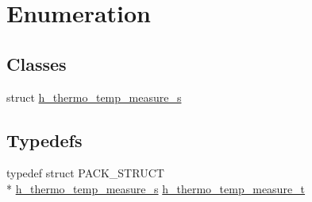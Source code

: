 \hypertarget{group___enumeration}{\section{Enumeration}
\label{group___enumeration}
}
\subsection*{Classes}
\begin{DoxyCompactItemize}
\item 
struct \hyperlink{structh__thermo__temp__measure__s}{h\-\_\-thermo\-\_\-temp\-\_\-measure\-\_\-s}
\end{DoxyCompactItemize}
\subsection*{Typedefs}
\begin{DoxyCompactItemize}
\item 
typedef struct P\-A\-C\-K\-\_\-\-S\-T\-R\-U\-C\-T \\*
\hyperlink{structh__thermo__temp__measure__s}{h\-\_\-thermo\-\_\-temp\-\_\-measure\-\_\-s} \hyperlink{group___enumeration_ga29b646d2e9db814fb80f36bfeeec82d1}{h\-\_\-thermo\-\_\-temp\-\_\-measure\-\_\-t}
\end{DoxyCompactItemize}
